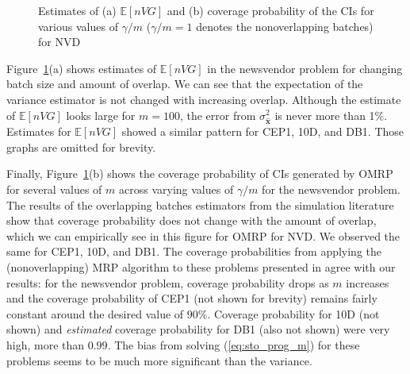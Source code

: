 \documentclass[12pt]{article}
\newcommand{\e}[1]{\mathbb{E} \left[ #1 \right]
}
\newcommand{\x}{\mathbf{x}}
\newcommand{\xh}{{\hat{\x}}}
\begin{document}
\begin{figure}[htb!]
	\centering
	\caption{ 
		Estimates of
		(a) $\e{nVG}$ and 
		(b) coverage probability of the CIs for various values of $\gamma/m$ ($\gamma/m=1$ denotes the nonoverlapping batches)
		 for NVD
	}
\label{fig:nv}
\end{figure}


Figure~\ref{fig:nv}(a) shows estimates of $\e{nVG}$ in the newsvendor problem for changing batch size and amount of overlap. 
We can see that the expectation of the variance estimator is not changed with increasing overlap. 
Although the estimate of $\e{nVG}$ looks large for $m=100$, the error from $\sigma^2_\xh$ is never more than 1\%.  
Estimates for $\e{nVG}$ showed a similar pattern for CEP1, 10D, and DB1.  
Those graphs are omitted for brevity.

Finally, Figure~\ref{fig:nv}(b) shows the coverage probability of CIs generated by OMRP for several values of $m$ across varying values of $\gamma/m$ for the newsvendor problem.  
The results of the overlapping batches estimators from the simulation literature show that coverage probability does not change with the amount of overlap, which we can  empirically see in this figure for OMRP for NVD.
We observed the same for CEP1, 10D, and DB1.  
The coverage probabilities from applying the (nonoverlapping) MRP algorithm to these problems presented in \citep{Bayraksan2006} agree with our results: for the newsvendor problem, coverage probability drops as $m$ increases and the coverage probability of CEP1 (not shown for brevity) remains fairly constant around the desired value of $90\%$. 
Coverage probability for 10D (not shown) and {\it estimated} coverage probability for DB1 (also not shown) were very high, more than $0.99$.  
The bias from solving (\ref{eq:sto_prog_m}) for these problems seems to be much more significant than the variance.
\end{document}
